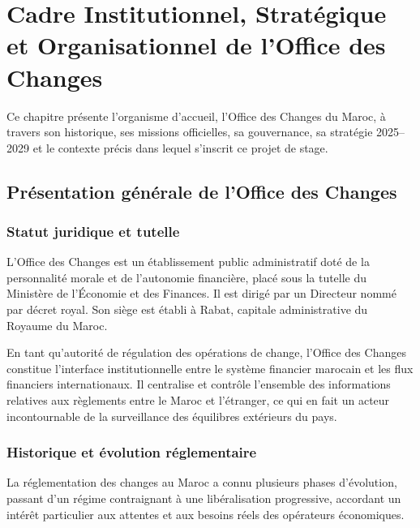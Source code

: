 \chapter{Cadre Institutionnel, Stratégique et Organisationnel de l'Office des Changes}

Ce chapitre présente l'organisme d'accueil, l'Office des Changes du Maroc, à travers son historique, ses missions officielles, sa gouvernance, sa stratégie 2025--2029 et le contexte précis dans lequel s'inscrit ce projet de stage.

\section{Présentation générale de l'Office des Changes}

\subsection{Statut juridique et tutelle}

L'Office des Changes est un établissement public administratif doté de la personnalité morale et de l'autonomie financière, placé sous la tutelle du Ministère de l'Économie et des Finances. Il est dirigé par un Directeur nommé par décret royal. Son siège est établi à Rabat, capitale administrative du Royaume du Maroc.

En tant qu'autorité de régulation des opérations de change, l'Office des Changes constitue l'interface institutionnelle entre le système financier marocain et les flux financiers internationaux. Il centralise et contrôle l'ensemble des informations relatives aux règlements entre le Maroc et l'étranger, ce qui en fait un acteur incontournable de la surveillance des équilibres extérieurs du pays.

\subsection{Historique et évolution réglementaire}

La réglementation des changes au Maroc a connu plusieurs phases d'évolution, passant d'un régime contraignant à une libéralisation progressive, accordant un intérêt particulier aux attentes et aux besoins réels des opérateurs économiques.

